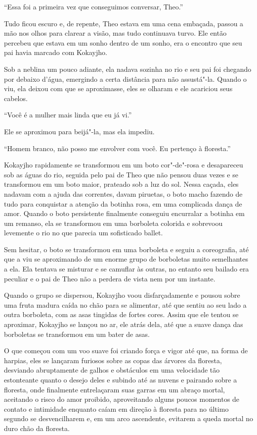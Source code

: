 ``Essa foi a primeira vez que conseguimos conversar, Theo.''

Tudo ficou escuro e, de repente, Theo estava em uma cena embaçada,
passou a mão nos olhos para clarear a visão, mas tudo continuava turvo.
Ele então percebeu que estava em um sonho dentro de um sonho, era o
encontro que seu pai havia marcado com Kokayjho.

Sob a neblina um pouco adiante, ela nadava sozinha no rio e seu pai foi
chegando por debaixo d'água, emergindo a certa distância para não
assustá"-la. Quando o viu, ela deixou com que se aproximasse, eles se
olharam e ele acariciou seus cabelos.

``Você é a mulher mais linda que eu já vi.''

Ele se aproximou para beijá"-la, mas ela impediu.

``Homem branco, não posso me envolver com você. Eu pertenço à
floresta.''

Kokayjho rapidamente se transformou em um boto cor"-de"-rosa e desapareceu
sob as águas do rio, seguida pelo pai de Theo que não pensou duas vezes
e se transformou em um boto maior, prateado sob a luz do sol. Nessa
caçada, eles nadavam com a ajuda das correntes, davam piruetas, o boto
macho fazendo de tudo para conquistar a atenção da botinha rosa, em uma
complicada dança de amor. Quando o boto persistente finalmente conseguiu
encurralar a botinha em um remanso, ela se transformou em uma borboleta
colorida e sobrevoou levemente o rio no que parecia um sofisticado
ballet.

Sem hesitar, o boto se transformou em uma borboleta e seguiu a
coreografia, até que a viu se aproximando de um enorme grupo de
borboletas muito semelhantes a ela. Ela tentava se misturar e se
camuflar às outras, no entanto seu bailado era peculiar e o pai de Theo
não a perdera de vista nem por um instante.

Quando o grupo se dispersou, Kokayjho voou disfarçadamente e pousou
sobre uma fruta madura caída no chão para se alimentar, até que sentiu
ao seu lado a outra borboleta, com as asas tingidas de fortes cores.
Assim que ele tentou se aproximar, Kokayjho se lançou no ar, ele atrás
dela, até que a suave dança das borboletas se transformou em um bater de
asas.

O que começou com um voo suave foi criando força e vigor até que, na
forma de harpias, eles se lançaram furiosos sobre as copas das árvores
da floresta, desviando abruptamente de galhos e obstáculos em uma
velocidade tão estonteante quanto o desejo deles e subindo até as nuvens
e pairando sobre a floresta, onde finalmente entrelaçaram suas garras em
um abraço mortal, aceitando o risco do amor proibido, aproveitando
alguns poucos momentos de contato e intimidade enquanto caíam em direção
à floresta para no último segundo se desvencilharem e, em um arco
ascendente, evitarem a queda mortal no duro chão da floresta.

